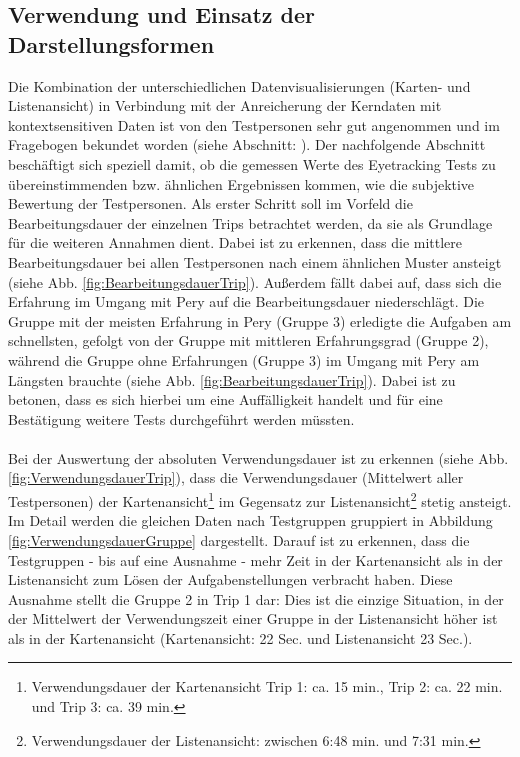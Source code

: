 \documentclass[Bachelorarbeit.tex]{subfiles}
\begin{document}
\subsection{Verwendung und Einsatz der Darstellungsformen}
Die Kombination der unterschiedlichen Datenvisualisierungen (Karten- und Listenansicht) in Verbindung mit der Anreicherung der Kerndaten mit kontextsensitiven Daten ist von den Testpersonen sehr gut angenommen und im Fragebogen bekundet worden (siehe Abschnitt: ).
Der nachfolgende Abschnitt beschäftigt sich speziell damit, ob die gemessen Werte des Eyetracking Tests zu übereinstimmenden bzw. ähnlichen Ergebnissen kommen,  wie die subjektive Bewertung der Testpersonen.
\pagebreak
Als erster Schritt soll im Vorfeld die Bearbeitungsdauer der einzelnen Trips betrachtet werden, da sie als Grundlage für die weiteren Annahmen dient. 
Dabei ist zu erkennen, dass die mittlere Bearbeitungsdauer bei allen Testpersonen nach einem ähnlichen Muster ansteigt (siehe Abb. \ref{fig:BearbeitungsdauerTrip}).
Außerdem fällt dabei auf, dass sich die Erfahrung im Umgang mit Pery auf die Bearbeitungsdauer niederschlägt. 
Die Gruppe mit der meisten Erfahrung in Pery (Gruppe 3) erledigte die Aufgaben am schnellsten, gefolgt von der Gruppe mit mittleren Erfahrungsgrad (Gruppe 2), während die Gruppe ohne Erfahrungen (Gruppe 3) im Umgang mit Pery am Längsten brauchte (siehe Abb. \ref{fig:BearbeitungsdauerTrip}).
Dabei ist zu betonen, dass es sich hierbei um eine Auffälligkeit handelt und für eine Bestätigung weitere Tests durchgeführt werden müssten.\\
\\
Bei der Auswertung der absoluten Verwendungsdauer ist zu erkennen (siehe Abb. \ref{fig:VerwendungsdauerTrip}), dass die Verwendungsdauer (Mittelwert aller Testpersonen) der Kartenansicht\footnote{Verwendungsdauer der Kartenansicht Trip 1: ca. 15 min., Trip 2: ca. 22 min. und Trip 3: ca. 39 min.} im Gegensatz zur Listenansicht\footnote{Verwendungsdauer der Listenansicht: zwischen 6:48 min. und 7:31 min.} stetig ansteigt.  
Im Detail werden die gleichen Daten nach Testgruppen gruppiert in Abbildung \ref{fig:VerwendungsdauerGruppe} dargestellt. 
Darauf ist zu erkennen, dass die Testgruppen - bis auf eine Ausnahme - mehr Zeit in der Kartenansicht als in der Listenansicht zum Lösen der Aufgabenstellungen verbracht haben. 
Diese Ausnahme stellt die Gruppe 2 in Trip 1 dar: Dies ist die einzige Situation, in der der Mittelwert der Verwendungszeit einer Gruppe in der Listenansicht höher ist als in der Kartenansicht (Kartenansicht: 22 Sec. und Listenansicht 23 Sec.).
\end{document}
